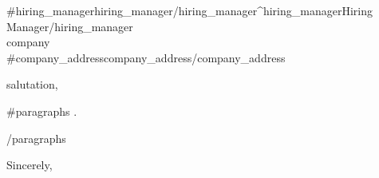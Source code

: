 \documentclass[11pt,letterpaper]{letter}
\begin{document}
\begin{letter}{
  {{#hiring_manager}}{{hiring_manager}}{{/hiring_manager}}{{^hiring_manager}}Hiring Manager{{/hiring_manager}} \\
  {{company}} \\
  {{#company_address}}{{company_address}}{{/company_address}}
}

\opening{ {{salutation}}, }

{{#paragraphs}}
{{.}}

{{/paragraphs}}

\closing{Sincerely,}

\end{letter}
\end{document}
